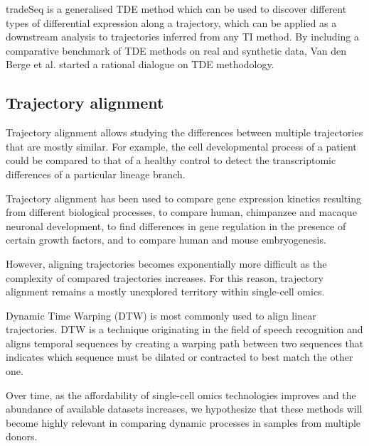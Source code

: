 tradeSeq \cite{vandenberge_trajectorybaseddifferentialexpression_2019} is a generalised TDE method which can be used to discover different types of differential expression along a trajectory, which can be applied as a downstream analysis to trajectories inferred from any TI method. By including a comparative benchmark of TDE methods on real and synthetic data, Van den Berge et al. started a rational dialogue on TDE methodology.

\subsection{Trajectory alignment}
Trajectory alignment allows studying the differences between multiple trajectories that are mostly similar. For example, the cell developmental process of a patient could be compared to that of a healthy control to detect the transcriptomic differences of a particular lineage branch. 

Trajectory alignment has been used to compare gene expression kinetics resulting from different biological processes\cite{cacchiarelli_aligningsinglecelldevelopmental_2018}, to compare human, chimpanzee and macaque neuronal development\cite{kanton_organoidsinglecellgenomic_2019}, to find differences in gene regulation in the presence of certain growth factors\cite{mcfaline-figueroa_pooledsinglecellgenetic_2019}, and to compare human and mouse embryogenesis\cite{alpert_alignmentsinglecelltrajectories_2018}.

However, aligning trajectories becomes exponentially more difficult as the complexity of compared trajectories increases. For this reason, trajectory alignment remains a mostly unexplored territory within single-cell omics.

Dynamic Time Warping (DTW) \cite{giorgino_computingvisualizingdynamic_2009} is most commonly used to align linear trajectories. DTW is a technique originating in the field of speech recognition and aligns temporal sequences by creating a warping path between two sequences that indicates which sequence must be dilated or contracted to best match the other one.

Over time, as the affordability of single-cell omics technologies improves and the abundance of available datasets increases, we hypothesize that these methods will become highly relevant in comparing dynamic processes in samples from multiple donors.

